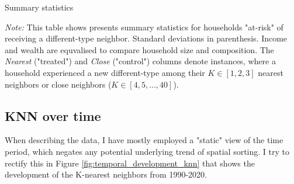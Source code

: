 \documentclass[main.tex]{subfiles}
\begin{document}
\begin{table}[H]
    \centering
    \caption{Summary statistics}
    \resizebox{\textwidth}{!}{}
    \label{tab:descriptives_native_and_non_west}
\begin{tablenotes}[flushleft]
\item \scriptsize \textit{Note:} This table shows presents summary statistics for households "at-risk" of receiving a different-type neighbor. Standard deviations in parenthesis. Income and wealth are equvalised to compare household size and composition. The \textit{Nearest} ("treated") and \textit{Close} ("control") columns denote instances, where a household experienced a new different-type among their $K\in [1,2,3]$ nearest neighbors or close neighbors ($K\in [4, 5, ...,40]$).
\end{tablenotes}
\end{table}

\subsection{KNN over time}
When describing the data, I have mostly employed a "static" view of the time period, which negates any potential underlying trend of spatial sorting. I try to rectify this in Figure \ref{fig:temporal_development_knn} that shows the development of the K-nearest neighbors from 1990-2020.
\end{document}
